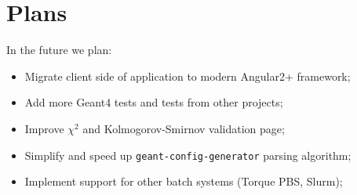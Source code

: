 \section{Plans}
\label{sec-plans}

In the future we plan:
\begin{itemize}
	\item Migrate client side of application to modern Angular2+ framework;
	\item Add more Geant4 tests and tests from other projects;
	\item Improve $\chi^2$ and Kolmogorov-Smirnov validation page;
	\item Simplify and speed up {\tt geant-config-generator} parsing algorithm;
	\item Implement support for other batch systems (Torque PBS, Slurm);
\end{itemize}
